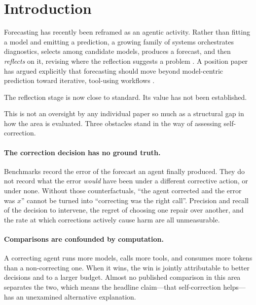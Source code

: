 \section{Introduction}
\label{sec:introduction}

Forecasting has recently been reframed as an agentic activity. Rather than fitting a
model and emitting a prediction, a growing family of systems orchestrates diagnostics,
selects among candidate models, produces a forecast, and then \emph{reflects} on it,
revising where the reflection suggests a problem
\citep{tsscientist2025,nexus2026,castflow2026,flairr2025,timeclaw2026}. A position
paper has argued explicitly that forecasting should move beyond model-centric
prediction toward iterative, tool-using workflows \citep{position2026}.

The reflection stage is now close to standard. Its value has not been established.

This is not an oversight by any individual paper so much as a structural gap in how the
area is evaluated. Three obstacles stand in the way of assessing self-correction.

\paragraph{The correction decision has no ground truth.}
Benchmarks record the error of the forecast an agent finally produced. They do not
record what the error \emph{would} have been under a different corrective action, or
under none. Without those counterfactuals, ``the agent corrected and the error was
$x$'' cannot be turned into ``correcting was the right call''. Precision and recall of
the decision to intervene, the regret of choosing one repair over another, and the rate
at which corrections actively cause harm are all unmeasurable.

\paragraph{Comparisons are confounded by computation.}
A correcting agent runs more models, calls more tools, and consumes more tokens than a
non-correcting one. When it wins, the win is jointly attributable to better decisions
and to a larger budget. Almost no published comparison in this area separates the two,
which means the headline claim---that self-correction helps---has an unexamined
alternative explanation.

